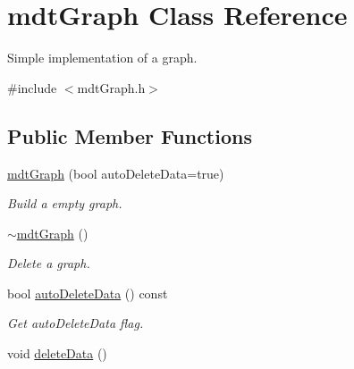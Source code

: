 \hypertarget{classmdt_graph}{
\section{mdtGraph Class Reference}
\label{classmdt_graph}
}


Simple implementation of a graph.  




{\ttfamily \#include $<$mdtGraph.h$>$}

\subsection*{Public Member Functions}
\begin{DoxyCompactItemize}
\item 
\hypertarget{classmdt_graph_a2e796f52cd0bd4b834238aefe3ea8dd7}{
\hyperlink{classmdt_graph_a2e796f52cd0bd4b834238aefe3ea8dd7}{mdtGraph} (bool autoDeleteData=true)}
\label{classmdt_graph_a2e796f52cd0bd4b834238aefe3ea8dd7}

\begin{DoxyCompactList}\small\item\em Build a empty graph. \end{DoxyCompactList}\item 
\hyperlink{classmdt_graph_af8ada447a57790709947943e3fcc3dea}{$\sim$mdtGraph} ()
\begin{DoxyCompactList}\small\item\em Delete a graph. \end{DoxyCompactList}\item 
\hypertarget{classmdt_graph_aeddbd0dd4e6c090eafe9923ca1bc1b60}{
bool \hyperlink{classmdt_graph_aeddbd0dd4e6c090eafe9923ca1bc1b60}{autoDeleteData} () const }
\label{classmdt_graph_aeddbd0dd4e6c090eafe9923ca1bc1b60}

\begin{DoxyCompactList}\small\item\em Get autoDeleteData flag. \end{DoxyCompactList}\item 
\hypertarget{classmdt_graph_a360d9e7076104aff9ea26d5fcfe4228b}{
void \hyperlink{classmdt_graph_a360d9e7076104aff9ea26d5fcfe4228b}{deleteData} ()}
\label{classmdt_graph_a360d9e7076104aff9ea26d5fcfe4228b}


\end{DoxyCompactItemize}
